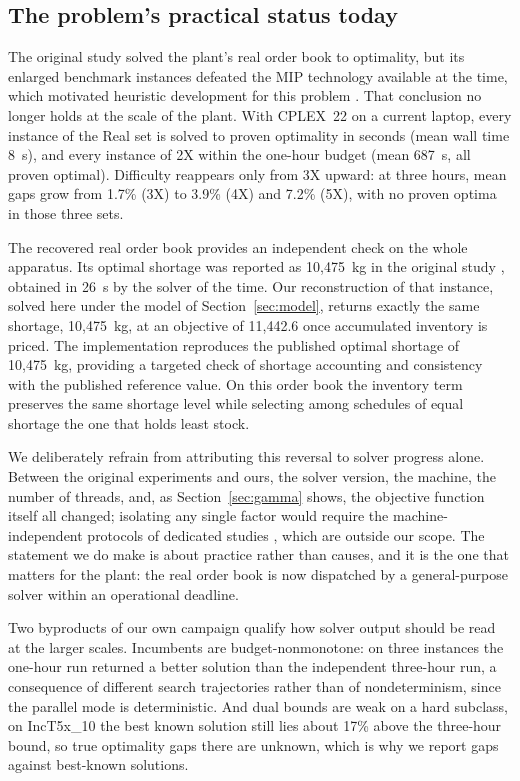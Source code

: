 \subsection{The problem's practical status today}
\label{sec:progress}

The original study solved the plant's real order book to optimality,
but its enlarged benchmark instances defeated the MIP technology
available at the time, which motivated heuristic development for this problem
\citep{luche2009combining}. That conclusion no longer holds at the
scale of the plant. With CPLEX~22 on a current laptop, every instance
of the Real set is solved to proven optimality in seconds (mean wall
time 8~s), and every instance of 2X within the one-hour budget (mean
687~s, all proven optimal). Difficulty reappears only from 3X upward:
at three hours, mean gaps grow from 1.7\% (3X) to 3.9\% (4X) and 7.2\%
(5X), with no proven optima in those three sets.

The recovered real order book provides an independent check on the
whole apparatus. Its optimal shortage was reported as 10{,}475~kg in
the original study \citep[Section~4.2]{luche2009combining}, obtained
in 26~s by the solver of the time. Our reconstruction of that instance,
solved here under the model of Section~\ref{sec:model}, returns
exactly the same shortage, 10{,}475~kg, at an objective of
11{,}442.6 once accumulated inventory is priced. The implementation
reproduces the published optimal shortage of 10{,}475~kg, providing a
targeted check of shortage accounting and consistency with the
published reference value. On this order book the inventory term
preserves the same shortage level while selecting among schedules of
equal shortage the one that holds least stock.

We deliberately refrain from attributing this reversal to solver
progress alone. Between the original experiments and ours, the solver
version, the machine, the number of threads, and, as Section~\ref{sec:gamma} shows, the objective function itself all
changed; isolating any single factor would require the
machine-independent protocols of dedicated studies
\citep{koch2022progress,achterberg2013analyzing}, which are outside our
scope. The statement we do make is about practice rather than causes,
and it is the one that matters for the plant: the real order book is
now dispatched by a general-purpose solver within an operational
deadline.

Two byproducts of our own campaign qualify how solver output should be
read at the larger scales. Incumbents are budget-nonmonotone: on three
instances the one-hour run returned a better solution than the
independent three-hour run, a consequence of different search
trajectories rather than of nondeterminism, since the parallel mode is
deterministic. And dual bounds are weak on a hard subclass, on
IncT5x\_10 the best known solution still lies about 17\% above the
three-hour bound, so true optimality gaps there are unknown, which is
why we report gaps against best-known solutions.


